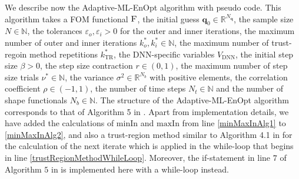 We describe now the Adaptive-ML-EnOpt algorithm with pseudo code. This algorithm takes a FOM functional $\textproc{F}$, the initial guess $\mathbf{q}_0\in\mathbb{R}^{N_\mathbf{q}}$, the sample size $N\in\mathbb{N}$, the tolerances $\varepsilon_o,\varepsilon_i>0$ for the outer and inner iterations, the maximum number of outer and inner iterations $k_o^*,k_i^*\in\mathbb{N}$, the maximum number of trust-regoin method repetitions $k^*_\mathrm{TR}$, the DNN-specific variables $V_{\mathrm{DNN}}$, the initial step size $\beta>0$, the step size contraction $r\in(0,1)$, the maximum number of step size trials $\nu^*\in\mathbb{N}$, the variance $\sigma^2\in\mathbb{R}^{N_b}$ with positive elements, the correlation coefficient $\rho\in(-1,1)$, the number of time steps $N_t\in\mathbb{N}$ and the number of shape functionals $N_b\in\mathbb{N}$. The structure of the Adaptive-ML-EnOpt algorithm corresponds to that of Algorithm 5 in \cite{Keil2022-dj}. Apart from implementation details, we have added the calculations of $\mathrm{minIn}$ and $\mathrm{maxIn}$ from line \ref{minMaxInAlg1} to \ref{minMaxInAlg2}, and also a trust-region method similar to Algorithm 4.1 in \cite{Nocedal2006-hg} for the calculation of the next iterate which is applied in the while-loop that begins in line \ref{trustRegionMethodWhileLoop}. Moreover, the if-statement in line $7$ of Algorithm $5$ in \cite{Keil2022-dj} is implemented here with a while-loop instead.%
